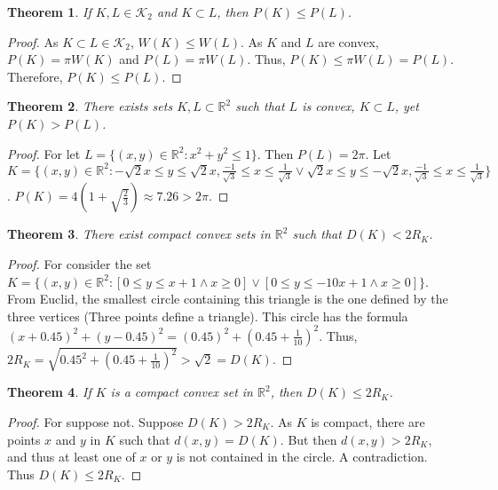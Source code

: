 \documentclass[oneside]{book}
\newtheorem{theorem}{Theorem}[section]
\theoremstyle{definition}
\begin{document}
\begin{theorem}
If $K,L\in \mathscr{K}_2$ and $K\subset L$, then $P(K)\leq P(L)$.
\end{theorem}
\begin{proof}
As $K\subset L\in  \mathscr{K}_2$, $W(K)\leq W(L)$. As $K$ and $L$ are convex, $P(K)=\pi W(K)$ and $P(L)=\pi W(L)$. Thus, $P(K) \leq \pi W(L) = P(L)$. Therefore, $P(K)\leq P(L)$.
\end{proof}

\begin{theorem}
There exists sets $K,L\subset \mathbb{R}^2$ such that $L$ is convex, $K\subset L$, yet $P(K)>P(L)$.
\end{theorem}
\begin{proof}
For let $L = \{(x,y)\in \mathbb{R}^2: x^2 + y^2 \leq 1\}$. Then $P(L) = 2\pi$. Let $K = \{(x,y)\in \mathbb{R}^2: -\sqrt{2}x\leq y \leq \sqrt{2}x,\frac{-1}{\sqrt{3}} \leq x \leq \frac{1}{\sqrt{3}} \lor \sqrt{2}x\leq y \leq -\sqrt{2}x,\frac{-1}{\sqrt{3}} \leq x \leq \frac{1}{\sqrt{3}} \}$. $P(K) = 4(1+ \sqrt{\frac{2}{3}}) \approx 7.26>2\pi$.
\end{proof}

\begin{figure}[!h]
  \centering
  \hfill
\end{figure}

\begin{theorem}
There exist compact convex sets in $\mathbb{R}^2$ such that $D(K) < 2R_K$.
\end{theorem}
\begin{proof}
For consider the set $K=\{(x,y)\in \mathbb{R}^2: [0\leq y\leq x+1 \land x\geq 0]\lor [0\leq y\leq -10x+1\land x\geq 0]\}$. From Euclid, the smallest circle containing this triangle is the one defined by the three vertices (Three points define a triangle). This circle has the formula $(x+0.45)^2+(y-0.45)^2 = (0.45)^2 +(0.45+\frac{1}{10})^2$. Thus, $2R_K = \sqrt{0.45^2 +(0.45+\frac{1}{10})^2} > \sqrt{2} = D(K)$.
\end{proof}

\begin{theorem}
If $K$ is a compact convex set in $\mathbb{R}^2$, then $D(K) \leq 2R_K$.
\end{theorem}
\begin{proof}
For suppose not. Suppose $D(K) > 2R_K$. As $K$ is compact, there are points $x$ and $y$ in $K$ such that $d(x,y)=D(K)$. But then $d(x,y)>2R_K$, and thus at least one of $x$ or $y$ is not contained in the circle. A contradiction. Thus $D(K)\leq 2R_K$.
\end{proof}
\end{document}
